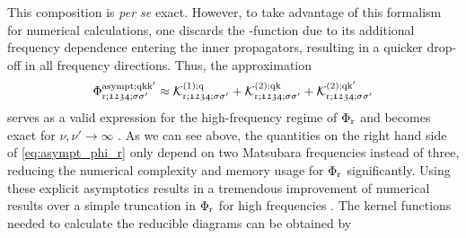 \documentclass[../../main.tex]{subfiles}
\begin{document}
This composition is \textit{per se} exact. However, to take advantage of this formalism for numerical calculations, one discards the -function due to its additional frequency dependence entering the inner propagators, resulting in a quicker drop-off in all frequency directions. Thus, the approximation
\begin{align}\label{eq:asympt_phi_r}
	\Phi_{\text{r};\mathfrak{1234};\sigma\sigma'}^{\text{asympt};\text{q}\text{k}\text{k}'}\approx\mathcal{K}^{(1);\text{q}}_{\text{r};\mathfrak{1234};\sigma\sigma'}+\mathcal{K}^{(2);\text{q}\text{k}}_{\text{r};\mathfrak{1234};\sigma\sigma'}+\mathcal{K}^{(2);\text{q}\text{k}'}_{\text{r};\mathfrak{1234};\sigma\sigma'}
\end{align}
serves as a valid expression for the high-frequency regime of $\Phi_{\text{r}}$ and becomes exact for $\nu,\nu'\to\infty$ \cite{high-freq asympt}. As we can see above, the quantities on the right hand side of \eqref{eq:asympt_phi_r} only depend on two Matsubara frequencies instead of three, reducing the numerical complexity and memory usage for $\Phi_{\text{r}}$ significantly. Using these explicit asymptotics results in a tremendous improvement of numerical results over a simple truncation in $\Phi_{\text{r}}$ for high frequencies \cite{high-freq asympt}. The kernel functions needed to calculate the reducible diagrams can be obtained by \cite{towards ab initio dga, josef DA, pudleiner paper}
\end{document}
